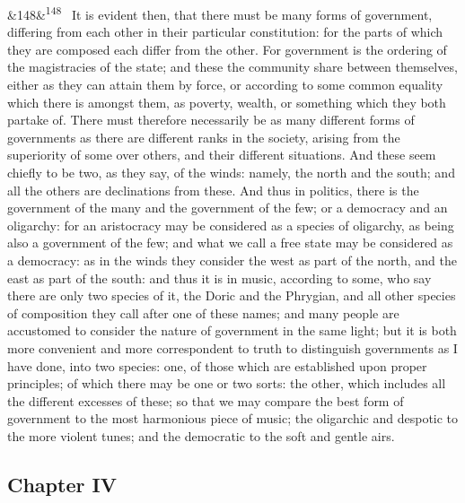 \documentclass[12pt]{article}
\newcommand{\para}[1][]{\par\noindent\ifx&#1&\else\textsuperscript{\footnotesize #1}~\fi}
\begin{document}
\para[148] It is evident then, that there must be many forms of government, differing from each other in their particular constitution: for the parts of which they are composed each differ from the other. For government is the ordering of the magistracies of the state; and these the community share between themselves, either as they can attain them by force, or according to some common equality which there is amongst them, as poverty, wealth, or something which they both partake of. There must therefore necessarily be as many different forms of governments as there are different ranks in the society, arising from the superiority of some over others, and their different situations. And these seem chiefly to be two, as they say, of the winds: namely, the north and the south; and all the others are declinations from these. And thus in politics, there is the government of the many and the government of the few; or a democracy and an oligarchy: for an aristocracy may be considered as a species of oligarchy, as being also a government of the few; and what we call a free state may be considered as a democracy: as in the winds they consider the west as part of the north, and the east as part of the south: and thus it is in music, according to some, who say there are only two species of it, the Doric and the Phrygian, and all other species of composition they call after one of these names; and many people are accustomed to consider the nature of government in the same light; but it is both more convenient and more correspondent to truth to distinguish governments as I have done, into two species: one, of those which are established upon proper principles; of which there may be one or two sorts: the other, which includes all the different excesses of these; so that we may compare the best form of government to the most harmonious piece of music; the oligarchic and despotic to the more violent tunes; and the democratic to the soft and gentle airs.

\subsection*{Chapter IV}
\end{document}
